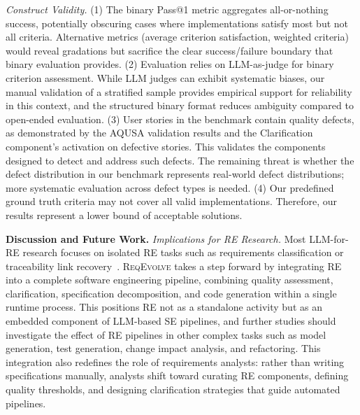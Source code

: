 \documentclass[sigconf,screen]{acmart}
\begin{document}
\textit{Construct Validity.} (1) The binary Pass@1 metric aggregates all-or-nothing success, potentially obscuring cases where implementations satisfy most but not all criteria. Alternative metrics (average criterion satisfaction, weighted criteria) would reveal gradations but sacrifice the clear success/failure boundary that binary evaluation provides. (2) Evaluation relies on LLM-as-judge for binary criterion assessment. While LLM judges can exhibit systematic biases, our manual validation of a stratified sample provides empirical support for reliability in this context, and the structured binary format reduces ambiguity compared to open-ended evaluation. (3) User stories in the benchmark contain quality defects, as demonstrated by the AQUSA validation results and the Clarification component's activation on defective stories. This validates the components designed to detect and address such defects. The remaining threat is whether the defect distribution in our benchmark represents real-world defect distributions; more systematic evaluation across defect types is needed. (4) Our predefined ground truth criteria may not cover all valid implementations. Therefore, our results represent a lower bound of acceptable solutions.

\textbf{Discussion and Future Work.} \textit{Implications for RE  Research.} Most LLM-for-RE research focuses on isolated RE tasks such as requirements classification or traceability link recovery~\cite{vogelsang2025impact}. \textsc{ReqEvolve} takes a step forward by integrating RE into a complete software engineering pipeline, combining quality assessment, clarification, specification decomposition, and code generation within a single runtime process. This positions RE not as a standalone activity but as an embedded component of LLM-based SE pipelines, and further studies should investigate the effect of RE pipelines in other complex tasks such as model generation, test generation, change impact analysis, and refactoring. This integration also redefines the role of requirements analysts: rather than writing specifications manually, analysts shift toward curating RE components, defining quality thresholds, and designing clarification strategies that guide automated pipelines.
\end{document}

